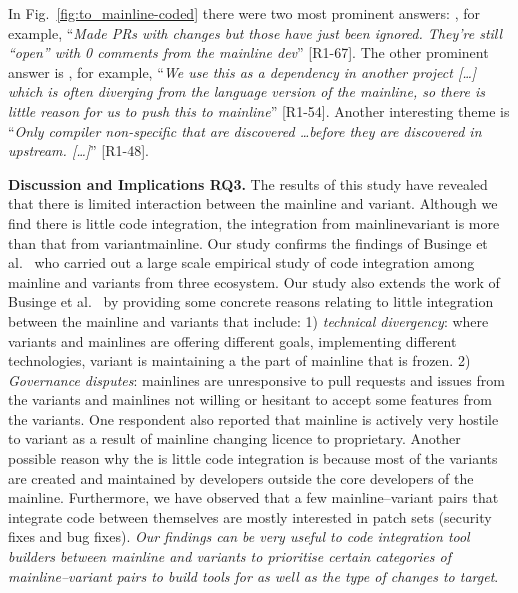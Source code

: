 In Fig.~\ref{fig:to_mainline-coded} there were two most prominent answers: , for example, ``\textit{Made PRs with changes but those have just been ignored. They're still ``open'' with 0 comments from the mainline dev}'' [R1-67]. The other prominent answer is  , for example, ``\emph{We use this as a dependency in another project [\ldots] which is often diverging from the language version of the mainline, so there is little reason for us to push this to mainline}'' [R1-54]. Another interesting theme is ``\emph{Only compiler non-specific that are discovered \ldots before they are discovered in upstream. [\ldots]}'' [R1-48].

\nd \textbf{Discussion and Implications RQ3.}
The results of this study have revealed that there is limited interaction between the mainline and variant.
Although we find there is little code integration, the integration from mainline\ra variant is more than that from variant\ra mainline. 
Our study confirms the findings of Businge et al.~\cite{businge:emse:2021} who carried out a large scale empirical study of code integration among mainline and variants from three ecosystem. Our study also extends the work of Businge et al.~\cite{businge:emse:2021} by providing some concrete reasons relating to little integration between the mainline and variants that include: 1) \textit{technical divergency}: where variants and mainlines are offering different goals, implementing different technologies, variant is maintaining a the part of mainline that is frozen. 2) \textit{Governance disputes}: mainlines are unresponsive to pull requests and issues from the variants and  mainlines not willing or hesitant to accept some features from the variants. One respondent also reported that mainline is actively very hostile to variant as a result of mainline changing licence to proprietary.
Another possible reason why the is little code integration is because most of the variants are created and maintained by developers outside the core developers of the mainline.
Furthermore, we have observed that a few mainline--variant pairs that integrate code between themselves are mostly interested in patch sets (security fixes and bug fixes). 
\textit{Our findings can be very useful to code integration tool builders between mainline and variants to prioritise certain categories of mainline--variant pairs to build tools for as well as the type of changes to target}. 